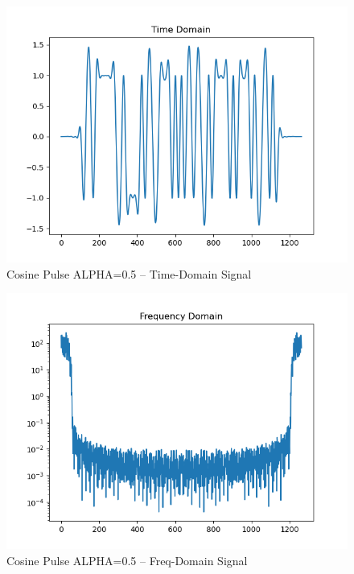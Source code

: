 \documentclass[
	letterpaper, %
	10pt, %
]{CSUniSchoolLabReport}
\begin{document}
\begin{figure}[H] %
	\centering %
	\includegraphics[width=1.2\textwidth]{assignment2g.png} %
	\caption{Cosine Pulse ALPHA=0.5 -- Time-Domain Signal}
	\label{fig:block}
\end{figure}

\begin{figure}[H] %
	\centering %
	\includegraphics[width=1.2\textwidth]{assignment2h.png} %
	\caption{Cosine Pulse ALPHA=0.5 -- Freq-Domain Signal}
	\label{fig:block}
\end{figure}
\end{document}
